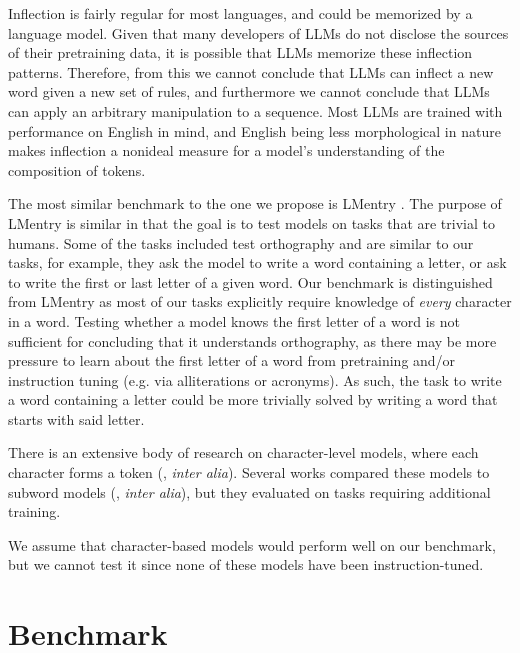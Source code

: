 Inflection is fairly regular for most languages, and could be memorized by a language model. Given that many developers of LLMs do not disclose the sources of their pretraining data, it is possible that LLMs memorize these inflection patterns. Therefore, from this we cannot conclude that LLMs can inflect a new word given a new set of rules, and furthermore we cannot conclude that LLMs can apply an arbitrary manipulation to a sequence. Most LLMs are trained with performance on English in mind, and English being less morphological in nature makes inflection a nonideal measure for a model's understanding of the composition of tokens.

The most similar benchmark to the one we propose is LMentry \cite{efrat-etal-2023-lmentry}. The purpose of LMentry is similar in that the goal is to test models on tasks that are trivial to humans. Some of the tasks included test orthography and are similar to our tasks, for example, they ask the model to write a word containing a letter, or ask to write the first or last letter of a given word. Our benchmark is distinguished from LMentry as most of our tasks explicitly require knowledge of \textit{every} character in a word. Testing whether a model knows the first letter of a word is not sufficient for concluding that it understands orthography, as there may be more pressure to learn about the first letter of a word from pretraining and/or instruction tuning (e.g. via alliterations or acronyms). As such, the task to write a word containing a letter could be more trivially solved by writing a word that starts with said letter. 

There is an extensive body of research on character-level models, where each character forms a token (\citealp{lee-etal-2017-fully,xue-etal-2022-byt5,tay2022charformer}, \textit{inter alia}). Several works compared these models to subword models (\citealp{libovicky-etal-2022-dont,edman-etal-2022-subword,edman2024characterlevel}, \textit{inter alia}), but they evaluated on tasks requiring additional training.

We assume that character-based models would perform well on our benchmark, but we cannot test it since none of these models have been instruction-tuned.

\section{Benchmark} \label{sect:benchmark}

